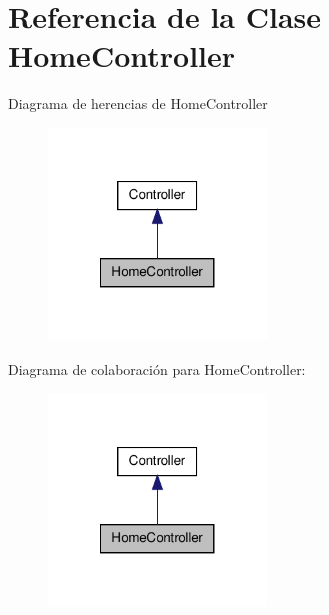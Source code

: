 \hypertarget{class_app_1_1_http_1_1_controllers_1_1_home_controller}{\section{\-Referencia de la \-Clase \-Home\-Controller}
\label{class_app_1_1_http_1_1_controllers_1_1_home_controller}
}


\-Diagrama de herencias de \-Home\-Controller
\nopagebreak
\begin{figure}[H]
\begin{center}
\leavevmode
\includegraphics[width=164pt]{class_app_1_1_http_1_1_controllers_1_1_home_controller__inherit__graph}
\end{center}
\end{figure}


\-Diagrama de colaboración para \-Home\-Controller\-:
\nopagebreak
\begin{figure}[H]
\begin{center}
\leavevmode
\includegraphics[width=164pt]{class_app_1_1_http_1_1_controllers_1_1_home_controller__coll__graph}
\end{center}
\end{figure}

